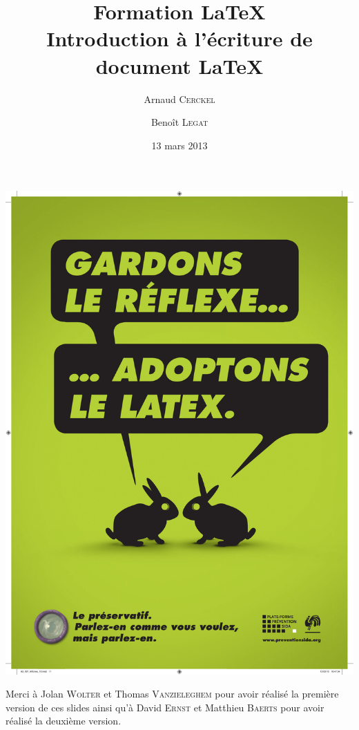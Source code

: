 \documentclass[10pt,svgnames,usenames,table]{beamer} %
\institute{Louvain-li-Nux}
\title{\textbf{Formation \LaTeX}\\Introduction à l'écriture de document \textrm{\LaTeX}}
\author{Arnaud \textsc{Cerckel} \and Benoît \textsc{Legat}}
\date{13 mars 2013}
\begin{document}
\begin{landscape}
\begin{frame}
	\vspace{-.5cm}
	\hspace*{.1mm}
	\includegraphics[page=1,height=\paperwidth]{latex_sida.pdf}
\end{frame}
\end{landscape}

\begin{frame}
\maketitle
Merci à Jolan \textsc{Wolter} et Thomas \textsc{Vanzieleghem} pour avoir réalisé la première version de ces slides
ainsi qu'à David \textsc{Ernst} et Matthieu \textsc{Baerts} pour avoir réalisé la deuxième version.
\end{frame}
\end{document}
